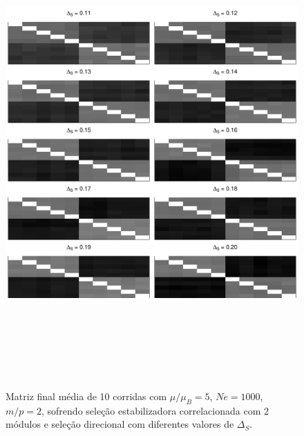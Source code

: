 \begin{center}
\begin{figure}[htbp]
  \includegraphics[width=150mm, height=180mm]{figuras/MatBDirecionalIntSel1120}
   \caption{Matriz final média de 10 corridas com
   $\mu/\mu_B = 5$, $Ne = 1000$, $m/p=2$, sofrendo seleção estabilizadora correlacionada com 2
   módulos e seleção direcional com diferentes valores de $\Delta_S$.}
  \label{MatBIntSel1120}
\end{figure}
\end{center}


